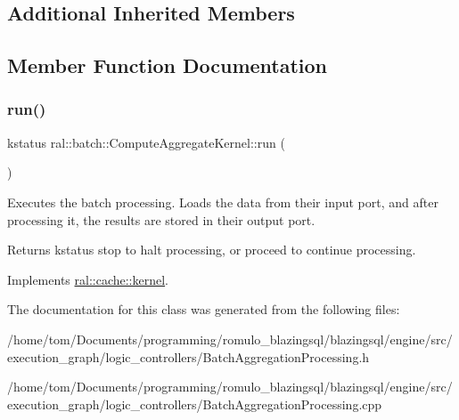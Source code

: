 \subsection*{Additional Inherited Members}


\subsection{Member Function Documentation}
\mbox{\label{classral_1_1batch_1_1ComputeAggregateKernel_ad3f8e41cf0adf95dbe0249a6dd9c1240}} 
\subsubsection{\texorpdfstring{run()}{run()}}
{\footnotesize\ttfamily kstatus ral\+::batch\+::\+Compute\+Aggregate\+Kernel\+::run (\begin{DoxyParamCaption}{ }\end{DoxyParamCaption})\hspace{0.3cm}{\ttfamily [virtual]}}



Executes the batch processing. Loads the data from their input port, and after processing it, the results are stored in their output port. 

\begin{DoxyReturn}{Returns}
kstatus \textquotesingle{}stop\textquotesingle{} to halt processing, or \textquotesingle{}proceed\textquotesingle{} to continue processing. 
\end{DoxyReturn}


Implements \hyperlink{classral_1_1cache_1_1kernel_a735b081cccae9574924e74ea6d293ef7}{ral\+::cache\+::kernel}.



The documentation for this class was generated from the following files\+:\begin{DoxyCompactItemize}
\item 
/home/tom/\+Documents/programming/romulo\+\_\+blazingsql/blazingsql/engine/src/execution\+\_\+graph/logic\+\_\+controllers/Batch\+Aggregation\+Processing.\+h\item 
/home/tom/\+Documents/programming/romulo\+\_\+blazingsql/blazingsql/engine/src/execution\+\_\+graph/logic\+\_\+controllers/Batch\+Aggregation\+Processing.\+cpp\end{DoxyCompactItemize}

